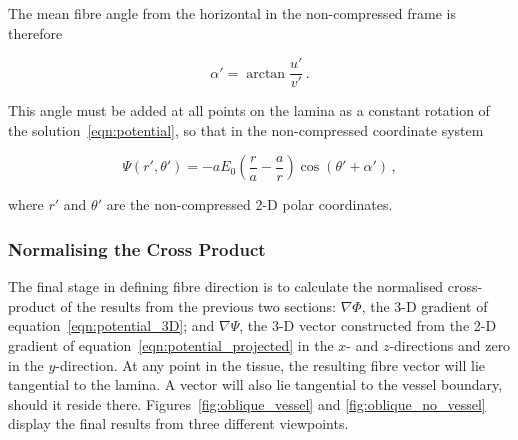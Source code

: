     The mean fibre angle from the horizontal in the non-compressed frame is therefore
    
    \begin{equation}
      \alpha' = \arctan \frac{u'}{v'}\,.
    \end{equation}
    
    This angle must be added at all points on the lamina as a constant rotation of the solution~\ref{eqn:potential}, so that in the non-compressed coordinate system
    
    \begin{equation}
      \Psi(r',\theta') = -aE_0 \left( \frac{r}{a} - \frac{a}{r} \right) \cos\left( \theta' + \alpha' \right)\,,
      \label{eqn:potential_projected}
    \end{equation}
    
    where $r'$ and $\theta'$ are the non-compressed 2-D polar coordinates.
    
    
    
  
  \subsubsection{Normalising the Cross Product} %
  \label{sub:normalising_the_cross_product}
    The final stage in defining fibre direction is to calculate the normalised cross-product of the results from the previous two sections: $\nabla\Phi$, the 3-D gradient of equation~\ref{eqn:potential_3D}; and $\nabla\Psi$, the 3-D vector constructed from the 2-D gradient of equation~\ref{eqn:potential_projected} in the $x$- and $z$-directions and zero in the $y$-direction. At any point in the tissue, the resulting fibre vector will lie tangential to the lamina. A vector will also lie tangential to the vessel boundary, should it reside there. Figures~\ref{fig:oblique_vessel} and \ref{fig:oblique_no_vessel} display the final results from three different viewpoints.
    
